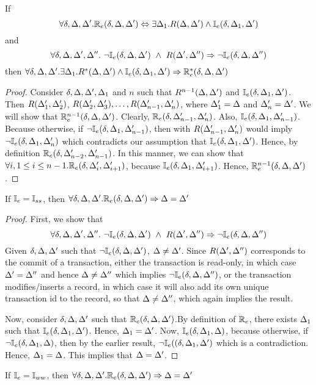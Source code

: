 \documentclass[acmlarge,anonymous]{acmart}\settopmatter{printfolios=true}
\begin{document}
\begin{theorem}
If 
$$
\forall \delta, \Delta, \Delta'. \mathbb{R}_e(\delta,\Delta,\Delta')  \Leftrightarrow  \exists \Delta_1.  R(\Delta, \Delta') \wedge \mathbb{I}_e(\delta, \Delta_1, \Delta')
$$
and
$$
  \forall \delta,\Delta,\Delta',\Delta''.~
  \neg\mathbb{I}_e(\delta,\Delta,\Delta') ~\wedge~ R(\Delta',\Delta'') \Rightarrow
  \neg\mathbb{I}_e(\delta,\Delta,\Delta'')
$$
then $\forall \delta, \Delta, \Delta'.\exists \Delta_1. R^{*}(\Delta, \Delta') \wedge \mathbb{I}_e(\delta, \Delta_1, \Delta') \Rightarrow \mathbb{R}_e^{*}(\delta, \Delta, \Delta')$
\end{theorem}
\begin{proof}
Consider $\delta, \Delta, \Delta', \Delta_1$ and $n$ such that $R^{n-1}(\Delta, \Delta')$ and $\mathbb{I}_e(\delta, \Delta_1, \Delta')$. Then $R(\Delta'_1, \Delta'_2)$, $R(\Delta'_2, \Delta'_3), \ldots, R(\Delta'_{n-1}, \Delta'_{n})$, where $\Delta'_1 = \Delta$ and $\Delta'_n = \Delta'$. We will show that $\mathbb{R}_e^{n-1}(\delta, \Delta, \Delta')$. Clearly, $\mathbb{R}_e(\delta, \Delta'_{n-1}, \Delta'_{n})$. Also, $\mathbb{I}_e(\delta, \Delta_1, \Delta'_{n-1})$. Because otherwise, if $\neg \mathbb{I}_e(\delta, \Delta_1, \Delta'_{n-1})$, then with $R(\Delta'_{n-1}, \Delta'_n)$ would imply $\neg \mathbb{I}_e(\delta, \Delta_1, \Delta'_{n})$ which contradicts our assumption that $\mathbb{I}_e(\delta, \Delta_1, \Delta')$. Hence, by definition $\mathbb{R}_e(\delta, \Delta'_{n-2}, \Delta'_{n-1})$. In this manner, we can show that $\forall i, 1 \leq i \leq n-1. \mathbb{R}_e(\delta, \Delta'_{i}, \Delta'_{i+1})$, because $\mathbb{I}_e(\delta, \Delta_1, \Delta'_{i+1})$. Hence, $\mathbb{R}_e^{n-1}(\delta, \Delta, \Delta')$.
\end{proof}

\begin{theorem}
If $\mathbb{I}_e = \mathbb{I}_{ss}$, then $\forall \delta, \Delta, \Delta'. \mathbb{R}_e(\delta, \Delta, \Delta') \Rightarrow \Delta = \Delta'$ 
\end{theorem}
\begin{proof}
First, we show that 
$$
  \forall \delta,\Delta,\Delta',\Delta''.~
  \neg\mathbb{I}_e(\delta,\Delta,\Delta') ~\wedge~ R(\Delta',\Delta'') \Rightarrow
  \neg\mathbb{I}_e(\delta,\Delta,\Delta'')
$$
Given $\delta, \Delta, \Delta'$ such that $\neg \mathbb{I}_e(\delta, \Delta, \Delta')$, $\Delta \neq \Delta'$. Since $R(\Delta', \Delta'')$ corresponds to the commit of a transaction, either the transaction is read-only, in which case $\Delta' = \Delta''$ and hence $\Delta \neq \Delta''$ which implies $\neg \mathbb{I}_e(\delta, \Delta, \Delta'')$, or the transaction modifies/inserts a record, in which case it will also add its own unique transaction id to the record, so that $\Delta \neq \Delta''$, which again implies the result.

Now, consider $\delta, \Delta, \Delta'$ such that $\mathbb{R}_e(\delta, \Delta, \Delta')$.By definition of $\mathbb{R}_e$, there exists $\Delta_1$ such that $\mathbb{I}_e(\delta, \Delta_1, \Delta')$. Hence, $\Delta_1 = \Delta'$. Now, $\mathbb{I}_e(\delta, \Delta_1, \Delta)$, because otherwise, if $\neg \mathbb{I}_e(\delta, \Delta_1, \Delta)$, then by the earlier result, $\neg \mathbb{I}_e((\delta, \Delta_1, \Delta')$ which is a contradiction. Hence, $\Delta_1 = \Delta$. This implies that $\Delta = \Delta'$.
\end{proof}

\begin{theorem}
If $\mathbb{I}_e = \mathbb{I}_{ww}$, then $\forall \delta, \Delta, \Delta'. \mathbb{R}_e(\delta, \Delta, \Delta') \Rightarrow \Delta = \Delta'$ 
\end{theorem}



\newpage



%
\small

\end{document}
